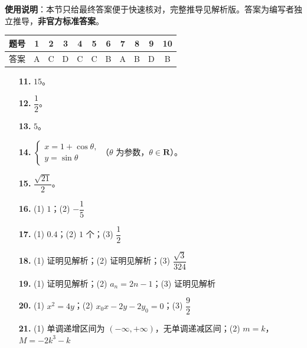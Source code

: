 
\begin{gknotice}
\textbf{使用说明}：本节只给最终答案便于快速核对，完整推导见解析版。答案为编写者独立推导，\textbf{非官方标准答案}。
\end{gknotice}

\begin{center}\begin{tabular}{ccccccccccc}
\toprule
题号 & 1 & 2 & 3 & 4 & 5 & 6 & 7 & 8 & 9 & 10 \\
\midrule
答案 & A & C & D & C & C & B & A & B & D & B \\
\bottomrule
\end{tabular}\end{center}

\begin{itemize}[leftmargin=2.6em]
  \item[\textbf{11.}] $15$。
  \item[\textbf{12.}] $\dfrac12$。
  \item[\textbf{13.}] $5$。
  \item[\textbf{14.}] $\begin{cases}x=1+\cos\theta,\\y=\sin\theta\end{cases}$（$\theta$ 为参数，$\theta\in\mathbf R$）。
  \item[\textbf{15.}] $\dfrac{\sqrt{21}}2$。
\end{itemize}

\begin{itemize}[leftmargin=2.6em]
  \item[\textbf{16.}] (1) $1$；(2) $-\dfrac15$
  \item[\textbf{17.}] (1) $0.4$；(2) $1$ 个；(3) $\dfrac12$
  \item[\textbf{18.}] (1) 证明见解析；(2) 证明见解析；(3) $\dfrac{\sqrt3}{324}$
  \item[\textbf{19.}] (1) 证明见解析；(2) $a_n=2n-1$；(3) 证明见解析
  \item[\textbf{20.}] (1) $x^2=4y$；(2) $x_0x-2y-2y_0=0$；(3) $\dfrac92$
  \item[\textbf{21.}] (1) 单调递增区间为 $(-\infty,+\infty)$，无单调递减区间；(2) $m=k$，$M=-2k^3-k$
\end{itemize}
